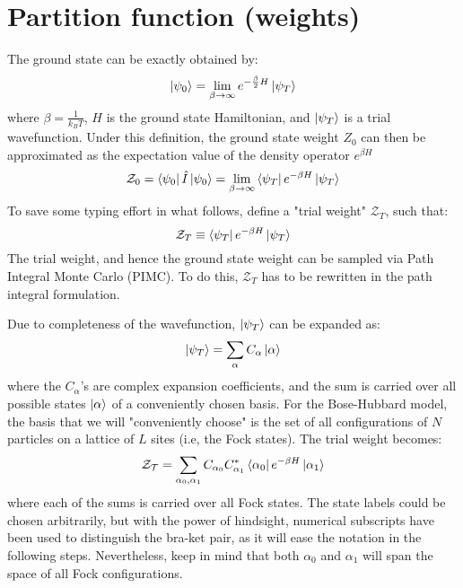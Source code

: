 \documentclass[12pt, two sided]{article}
\begin{document}
\section{Partition function (weights)}

The ground state can be exactly obtained by:
%
\begin{equation}
\ket{\psi_0} = \lim_{\beta\to\infty} e^{-\frac{\beta}{2} H}\ket{\psi_T} 
\end{equation}
%
where $\beta = \frac{1}{k_B  T}$, $H$ is the ground state Hamiltonian, and $\ket{\psi_T}$ is a trial wavefunction. Under this definition, the ground state weight $Z_0$ can then be approximated as the expectation value of the density operator $e^{\beta H}$
%
\begin{equation}
\label{eq:z_0_01}
\mathcal{Z}_0 = \bra{\psi_0} \hat{I} \ket{\psi_0} = \lim_{\beta\to\infty} \bra{\psi_T} e^{-\beta H} \ket{\psi_T}
\end{equation}
%
To save some typing effort in what follows, define a "trial weight" $\mathcal{Z}_T$, such that:
%
\begin{equation}
\mathcal{Z}_T \equiv  \bra{\psi_T} e^{-\beta H} \ket{\psi_T}
\end{equation}
%
The trial weight, and hence the ground state weight can be sampled via Path Integral Monte Carlo (PIMC). To do this, $\mathcal{Z}_T$ has to be rewritten in the path integral formulation.

Due to completeness of the wavefunction, $\ket{\psi_T}$ can be expanded as:
%
\begin{equation}
\ket{\psi_T} = \sum_{\alpha} C_{\alpha} \ket{\alpha}
\end{equation}
%
where the $C_\alpha$'s are complex expansion coefficients, and the sum is carried over all possible states $\ket{\alpha}$ of a conveniently chosen basis. For the Bose-Hubbard model, the basis that we will "conveniently choose" is the set of all configurations of $N$ particles on a lattice of $L$ sites (i.e, the Fock states). The trial weight becomes:
%
\begin{equation}
\mathcal{Z_T} = \sum_{\alpha_0, \alpha_1} C_{\alpha_0} C_{\alpha_1}^{*} \bra{\alpha_0} e^{-\beta H} \ket{\alpha_1}
\end{equation}
%
where each of the sums is carried over all Fock states. The state labels could be chosen arbitrarily, but with the power of hindsight, numerical subscripts have been used to distinguish the bra-ket pair, as it will ease the notation in the following steps. Nevertheless, keep in mind that both $\alpha_0$ and $\alpha_1$ will span the space of all Fock configurations.
\end{document}
